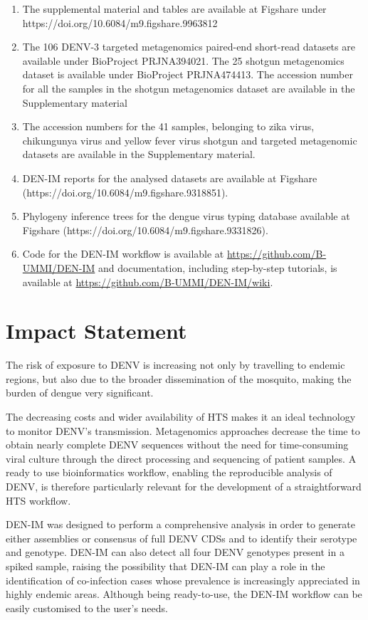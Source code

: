 \begin{enumerate}
    \item The supplemental material and tables are available at Figshare under https://doi.org/10.6084/m9.figshare.9963812
    \item The 106 DENV-3 targeted metagenomics paired-end short-read datasets are available under BioProject PRJNA394021. The 25 shotgun metagenomics dataset is available under BioProject PRJNA474413. The accession number for all the samples in the shotgun metagenomics dataset are available in the Supplementary material
    \item The accession numbers for the 41 samples, belonging to zika virus, chikungunya virus and yellow fever virus shotgun and targeted metagenomic datasets are available in the Supplementary material. 
    \item DEN-IM reports for the analysed datasets are available at Figshare  (https://doi.org/10.6084/m9.figshare.9318851).
    \item Phylogeny inference trees for the dengue virus typing database available at Figshare (https://doi.org/10.6084/m9.figshare.9331826).
    \item Code for the DEN-IM workflow is available at \url{https://github.com/B-UMMI/DEN-IM} and documentation, including step-by-step tutorials, is available at \url{https://github.com/B-UMMI/DEN-IM/wiki}.
\end{enumerate}

\section{Impact Statement}
The risk of exposure to DENV is increasing not only by travelling to endemic regions, but also due to the broader dissemination of the mosquito, making the burden of dengue very significant.

The decreasing costs and wider availability of HTS makes it an ideal technology to monitor DENV’s transmission. Metagenomics approaches decrease the time to obtain nearly complete DENV sequences without the need for time-consuming viral culture through the direct processing and sequencing of patient samples. A ready to use bioinformatics workflow, enabling the reproducible analysis of DENV, is therefore particularly relevant for the development of a straightforward HTS workflow.

DEN-IM was designed to perform a comprehensive analysis in order to generate either assemblies or consensus of full DENV CDSs and to identify their serotype and genotype. DEN-IM can also detect all four DENV genotypes present in a spiked sample, raising the possibility that DEN-IM can play a role in the identification of co-infection cases whose prevalence is increasingly appreciated in highly endemic areas. Although being ready-to-use, the DEN-IM workflow can be easily customised to the user’s needs.

